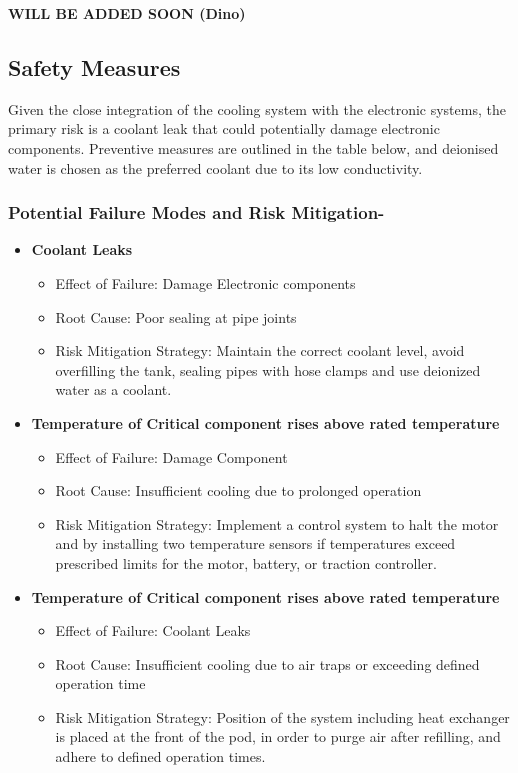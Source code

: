 \textbf{WILL BE ADDED SOON (Dino)}
\subsection{Safety Measures}
Given the close integration of the cooling system with the electronic systems, the primary risk is a coolant leak that could potentially damage electronic components. Preventive measures are outlined in the table below, and deionised water is chosen as the preferred coolant due to its low conductivity.
\subsubsection{Potential Failure Modes and Risk Mitigation-}
\begin{itemize}
  \item \textbf{Coolant Leaks}
    \begin{itemize}
      \item Effect of Failure: Damage Electronic components
      \item Root Cause: Poor sealing at pipe joints
      \item Risk Mitigation Strategy: Maintain the correct coolant level, avoid overfilling the tank, sealing pipes with hose clamps and use deionized water as a coolant.
    \end{itemize}
  \item \textbf{Temperature of Critical component rises above rated temperature}
    \begin{itemize}
      \item Effect of Failure: Damage Component
      \item Root Cause: Insufficient cooling due to prolonged operation
      \item Risk Mitigation Strategy: Implement a control system to halt the motor and by installing two temperature sensors if temperatures exceed prescribed limits for the motor, battery, or traction controller.
    \end{itemize}
  \item \textbf{Temperature of Critical component rises above rated temperature}
    \begin{itemize}
      \item Effect of Failure: Coolant Leaks
      \item Root Cause: Insufficient cooling due to air traps or exceeding defined operation time
      \item Risk Mitigation Strategy: Position of the system including heat exchanger is placed at the front of the pod, in order to purge air after refilling, and adhere to defined operation times.

\end{itemize}
\end{itemize}

